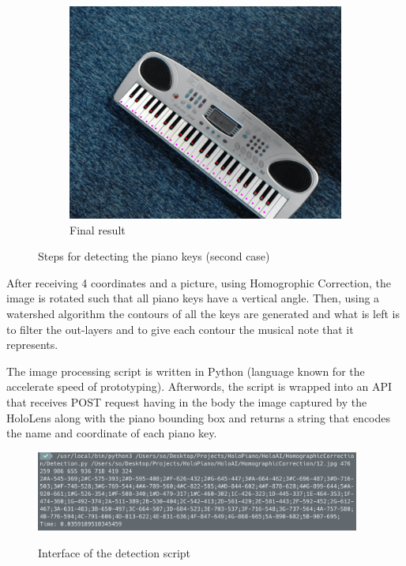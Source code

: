 \documentclass[12 pct]{report}
\begin{document}
\begin{figure}[H]
\begin{subfigure}[b]{0.7\linewidth}
    \includegraphics[width=\linewidth]{piano-pointsv2}
    \caption{Final result}
  \end{subfigure}
  \caption{Steps for detecting the piano keys (second case)}
  \label{fig:coffee3}
\end{figure}

After receiving 4 coordinates and a picture, using Homogrophic Correction, the image is rotated such that all piano keys have a vertical angle. Then, using a watershed algorithm the contours of all the keys are generated and what is left is to filter the out-layers and to give each contour the musical note that it represents. 

The image processing script is written in Python (language known for the accelerate speed of prototyping). Afterwords, the script is wrapped into an API that receives POST request having in the body the image captured by the HoloLens along with the piano bounding box and returns a string that encodes the name and coordinate of each piano key.

\begin{figure}[H]
\includegraphics[width=0.95\textwidth]{holopiano-detection}
\centering
\label{fig:feature-points}
\caption{Interface of the detection script}
\end{figure}
\end{document}
